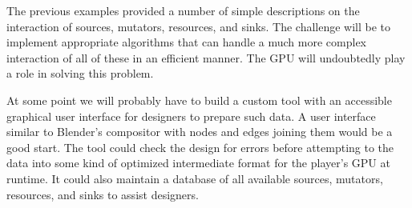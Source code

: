 


The previous examples provided a number of simple descriptions on the interaction of sources, mutators, resources, and sinks. The challenge will be to implement appropriate algorithms that can handle a much more complex interaction of all of these in an efficient manner. The GPU will undoubtedly play a role in solving this problem.

At some point we will probably have to build a custom tool with an accessible graphical user interface for designers to prepare such data. A user interface similar to Blender's compositor with nodes and edges joining them would be a good start. The tool could check the design for errors before attempting to  the data into some kind of optimized intermediate format for the player's GPU at runtime. It could also maintain a database of all available sources, mutators, resources, and sinks to assist designers.

